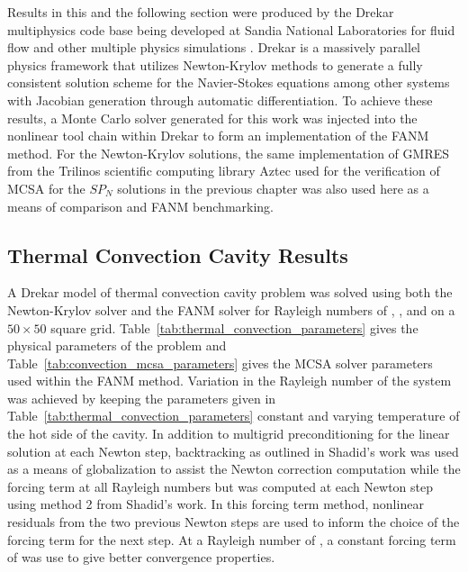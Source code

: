 Results in this and the following section were produced by the Drekar
multiphysics code base being developed at Sandia National Laboratories
for fluid flow and other multiple physics simulations
\cite{pawlowski_drekar_2012}. Drekar is a massively parallel physics
framework that utilizes Newton-Krylov methods to generate a fully
consistent solution scheme for the Navier-Stokes equations among other
systems with Jacobian generation through automatic differentiation. To
achieve these results, a Monte Carlo solver generated for this work
was injected into the nonlinear tool chain within Drekar to form an
implementation of the FANM method. For the Newton-Krylov solutions,
the same implementation of GMRES from the Trilinos scientific
computing library Aztec \cite{heroux_overview_2005} used for the
verification of MCSA for the $SP_N$ solutions in the previous chapter
was also used here as a means of comparison and FANM benchmarking.

\subsection{Thermal Convection Cavity Results}
\label{subsec:thermal_convection_verification}

A Drekar model of thermal convection cavity problem was solved using
both the Newton-Krylov solver and the FANM solver for Rayleigh numbers
of , ,  and  on a $50 \times 50$
square grid. Table~\ref{tab:thermal_convection_parameters} gives the
physical parameters of the problem and
Table~\ref{tab:convection_mcsa_parameters} gives the MCSA solver
parameters used within the FANM method. Variation in the Rayleigh
number of the system was achieved by keeping the parameters given in
Table~\ref{tab:thermal_convection_parameters} constant and varying
temperature of the hot side of the cavity. In addition to multigrid
preconditioning for the linear solution at each Newton step,
backtracking as outlined in Shadid's work \cite{shadid_inexact_1997}
was used as a means of globalization to assist the Newton correction
computation while the forcing term at all Rayleigh numbers but
 was computed at each Newton step using method 2 from
Shadid's work. In this forcing term method, nonlinear residuals from
the two previous Newton steps are used to inform the choice of the
forcing term for the next step. At a Rayleigh number of , a
constant forcing term of  was use to give better convergence
properties.

